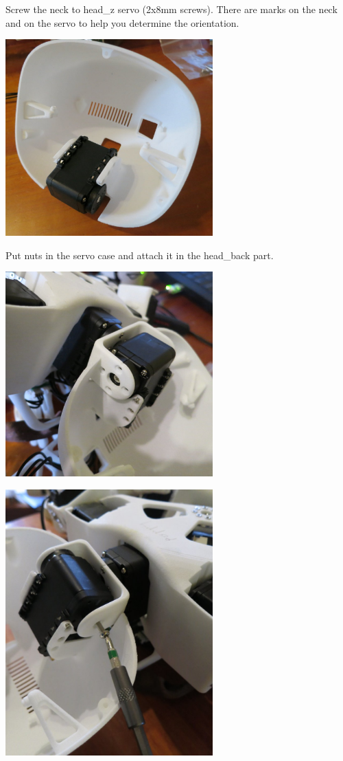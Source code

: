 \documentclass{article}
\begin{document}
 Screw the neck to head\_z servo (\diameter 2x8mm screws). There are marks on the neck and on the servo to help you determine the orientation.
 
 
 \begin{center}
  \includegraphics[width=0.6\textwidth]{img/neck2}
 \end{center}
 
 Put  nuts in the servo case and attach it in the head\_back part.
 
  \begin{center}
  \includegraphics[width=0.6\textwidth]{img/neck3}
 \end{center}

  \begin{center}
  \includegraphics[width=0.6\textwidth]{img/neck4}\\
 \end{center}
\end{document}
